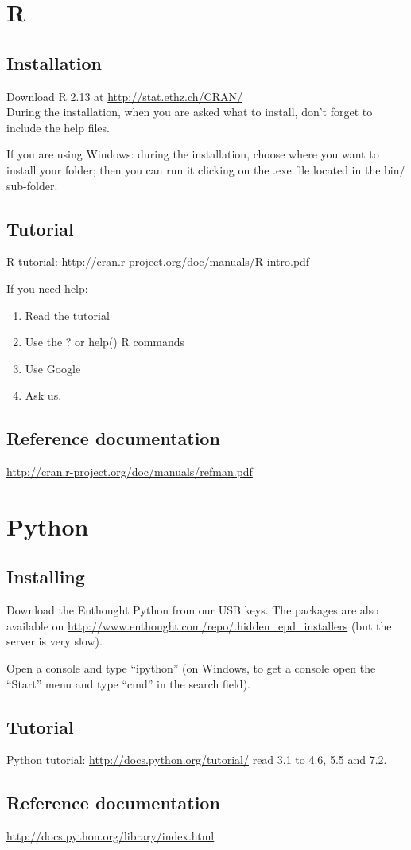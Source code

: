 \documentclass[a4paper,11pt]{article}
\begin{document}
\clearpage
\section{R}
\subsection{Installation}
Download R 2.13 at \url{http://stat.ethz.ch/CRAN/}\\
During the installation, when you are asked what to install, don't forget to include the help files.

If you are using Windows: during the installation, choose where you want to install your folder; then you can run it clicking on the .exe file located in the bin/ sub-folder.

\subsection{Tutorial}
R tutorial: \url{http://cran.r-project.org/doc/manuals/R-intro.pdf}

If you need help:
\begin{enumerate}
\item Read the tutorial
\item Use the ? or help() R commands
\item Use Google
\item Ask us.
\end{enumerate}

\subsection{Reference documentation}
\url{http://cran.r-project.org/doc/manuals/refman.pdf}

\section{Python}

\subsection{Installing}
Download the Enthought Python from our USB keys. The packages are also available on \url{http://www.enthought.com/repo/.hidden\_epd\_installers} (but the server is very slow).

Open a console and type ``ipython''
(on Windows, to get a console open the ``Start'' menu and type ``cmd'' in the search field).

\subsection{Tutorial}
Python tutorial: \url{http://docs.python.org/tutorial/} read 3.1 to 4.6, 5.5 and 7.2.

\subsection{Reference documentation}
\url{http://docs.python.org/library/index.html}
\end{document}
